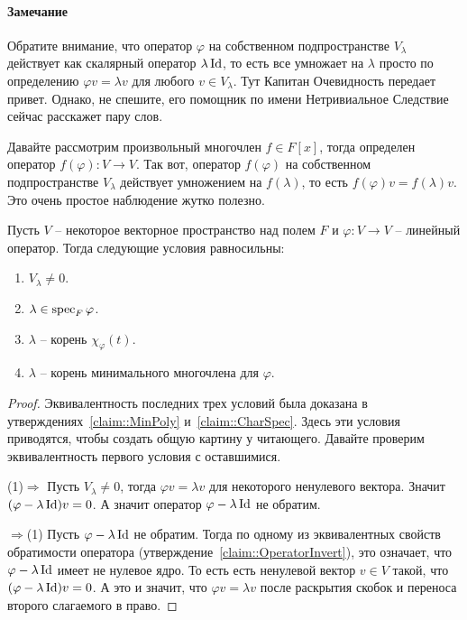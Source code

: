 \paragraph{Замечание}

Обратите внимание, что оператор $\varphi$ на собственном подпространстве $V_\lambda$ действует как скалярный оператор $\lambda \operatorname{Id}$, то есть все умножает на $\lambda$ просто по определению $\varphi v = \lambda v$ для любого $v\in V_\lambda$. Тут Капитан Очевидность передает привет. Однако, не спешите, его помощник по имени Нетривиальное Следствие сейчас расскажет пару слов.

Давайте рассмотрим произвольный многочлен $f\in F[x]$, тогда определен оператор $f(\varphi)\colon V\to V$. Так вот, оператор $f(\varphi)$ на собственном подпространстве $V_\lambda$ действует умножением на $f(\lambda)$, то есть $f(\varphi) v = f(\lambda) v$. Это очень простое наблюдение жутко полезно.


\begin{claim}\label{claim::EigenSpec}
Пусть $V$ -- некоторое векторное пространство над полем $F$ и $\varphi \colon V\to V$ -- линейный оператор. Тогда следующие условия равносильны:
\begin{enumerate}
\item $V_\lambda \neq 0$. 
\item $\lambda \in \operatorname{spec}_F\varphi$.
\item $\lambda$ -- корень $\chi_\varphi(t)$.
\item $\lambda$ -- корень минимального многочлена для $\varphi$.
\end{enumerate}
\end{claim}
\begin{proof}
Эквивалентность последних трех условий была доказана в утверждениях~\ref{claim::MinPoly} и~\ref{claim::CharSpec}. Здесь эти условия приводятся, чтобы создать общую картину у читающего. Давайте проверим эквивалентность первого условия с оставшимися.

(1)$\Rightarrow$ Пусть $V_\lambda \neq 0$, тогда $\varphi v = \lambda v$ для некоторого ненулевого вектора. Значит $(\varphi - \lambda \operatorname{Id})v = 0$. А значит оператор $\varphi - \lambda \operatorname{Id}$ не обратим.

$\Rightarrow$(1) Пусть $\varphi -\lambda \operatorname{Id}$ не обратим. Тогда по одному из эквивалентных свойств обратимости оператора (утверждение~\ref{claim::OperatorInvert}), это означает, что $\varphi - \lambda \operatorname{Id}$ имеет не нулевое ядро. То есть есть ненулевой вектор $v\in V$ такой, что $(\varphi - \lambda \operatorname{Id})v = 0$. А это и значит, что $\varphi v = \lambda v$ после раскрытия скобок и переноса второго слагаемого в право.
\end{proof}

